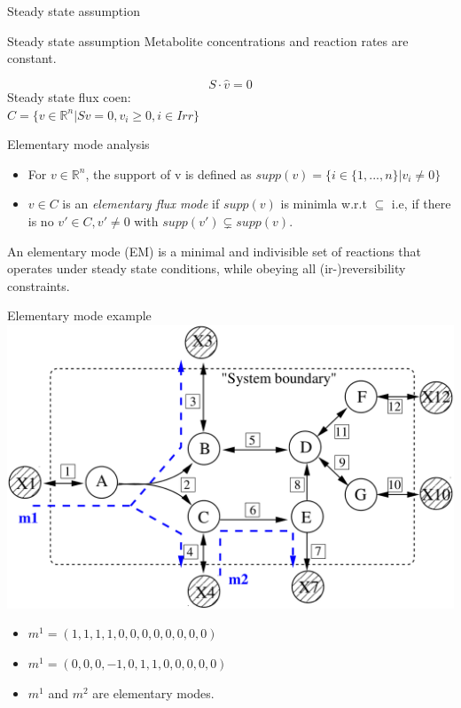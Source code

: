 \documentclass{beamer}
\begin{document}
\begin{frame}{Steady state assumption}    
    \begin{block}{Steady state assumption}
        Metabolite concentrations and reaction rates are constant.
    \end{block}
    \begin{equation}
    S \cdot \hat{v} = 0 
    \end{equation}
    Steady state flux coen: \\
    $C = \{v \in \mathbb{R}^n | Sv = 0, v_i \geq 0, i \in Irr \}$
\end{frame}

\begin{frame}{Elementary mode analysis}
    \begin{itemize}
        \item For $v \in \mathbb{R}^n$, the support of v is defined as 
        $supp(v) = \{i \in \{1, ..., n \} | v_i \neq 0  \}$
    
        \item $v \in C$ is an \emph{elementary flux mode} if $supp(v)$
        is minimla w.r.t $\subseteq$
        i.e, if there is no $v' \in C, v' \neq 0$ with 
        $supp(v') \subsetneq supp(v)$.
    \end{itemize}
    
    
    \begin{definition}
        An elementary mode (EM) is a minimal and indivisible set 
        of reactions that operates under steady state conditions, 
        while obeying all (ir-)reversibility constraints.
    \end{definition}
    
\end{frame}
\begin{frame}{Elementary mode example}
    \includegraphics[width=.7\textwidth]{grafik/EMnet1}
    \begin{itemize}
        \item $m^{1} = (1, 1, 1, 1, 0, 0, 0, 0, 0, 0, 0 ,0)$
        \item $m^{1} = (0, 0, 0, -1, 0, 1, 1, 0, 0, 0, 0 ,0)$
        \item $m^{1}$ and $m^{2}$ are elementary modes.
    \end{itemize}
\end{frame}
\end{document}
